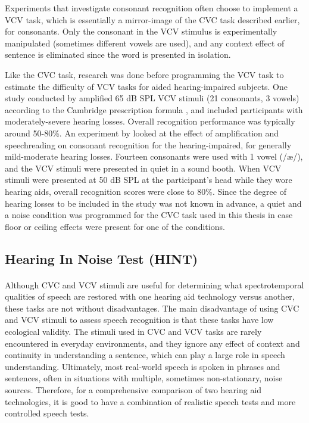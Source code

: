 Experiments that investigate consonant recognition often choose to implement a VCV task, which is essentially a mirror-image of the CVC task described earlier, for consonants.  Only the consonant in the VCV stimulus is experimentally manipulated (sometimes different vowels are used), and any context effect of sentence is eliminated since the word is presented in isolation.

Like the CVC task, research was done before programming the VCV task to estimate the difficulty of VCV tasks for aided hearing-impaired subjects.  One study conducted by  amplified 65 dB SPL VCV stimuli (21 consonants, 3 vowels) according to the Cambridge prescription formula \cite{Moore1998}, and included participants with moderately-severe hearing losses.  Overall recognition performance was typically around 50-80\%.  An experiment by  looked at the effect of amplification and speechreading on consonant recognition for the hearing-impaired, for generally mild-moderate hearing losses.  Fourteen consonants were used with 1 vowel (/\ae /), and the VCV stimuli were presented in quiet in a sound booth.  When VCV stimuli were presented at 50 dB SPL at the participant's head while they wore hearing aids, overall recognition scores were close to 80\%.  Since the degree of hearing losses to be included in the study was not known in advance, a quiet and a noise condition was programmed for the CVC task used in this thesis in case floor or ceiling effects were present for one of the conditions.


\subsection{Hearing In Noise Test (HINT)}
\paragraph{}Although CVC and VCV stimuli are useful for determining what spectrotemporal qualities of speech are restored with one hearing aid technology versus another, these tasks are not without disadvantages.  The main disadvantage of using CVC and VCV stimuli to assess speech recognition is that these tasks have low ecological validity.  The stimuli used in CVC and VCV tasks are rarely encountered in everyday environments, and they ignore any effect of context and continuity in understanding a sentence, which can play a large role in speech understanding.  Ultimately, most real-world speech is spoken in phrases and sentences, often in situations with multiple, sometimes non-stationary, noise sources.  Therefore, for a comprehensive comparison of two hearing aid technologies, it is good to have a combination of realistic speech tests and more controlled speech tests.

